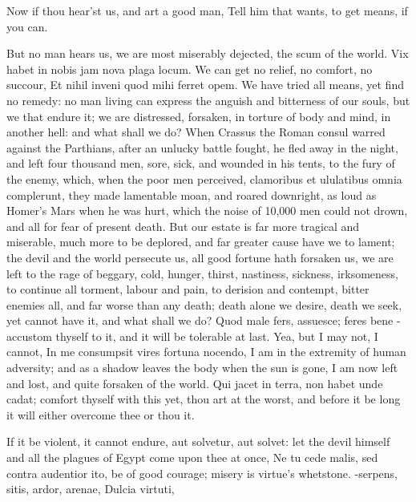 {Now if thou hear'st us, and art a good man,
Tell him that wants, to get means, if you can.

But no man hears us, we are most miserably dejected, the scum of the
world. Vix habet in nobis jam nova plaga locum. We can get no
relief, no comfort, no succour, Et nihil inveni quod mihi ferret
opem. We have tried all means, yet find no remedy: no man living can
express the anguish and bitterness of our souls, but we that endure it;
we are distressed, forsaken, in torture of body and mind, in another
hell: and what shall we do? When Crassus the Roman consul warred
against the Parthians, after an unlucky battle fought, he fled away in
the night, and left four thousand men, sore, sick, and wounded in his
tents, to the fury of the enemy, which, when the poor men perceived,
clamoribus et ululatibus omnia complerunt, they made lamentable moan,
and roared downright, as loud as Homer's Mars when he was hurt, which
the noise of 10,000 men could not drown, and all for fear of present
death. But our estate is far more tragical and miserable, much more to
be deplored, and far greater cause have we to lament; the devil and the
world persecute us, all good fortune hath forsaken us, we are left to
the rage of beggary, cold, hunger, thirst, nastiness, sickness,
irksomeness, to continue all torment, labour and pain, to derision and
contempt, bitter enemies all, and far worse than any death; death alone
we desire, death we seek, yet cannot have it, and what shall we do?
Quod male fers, assuesce; feres bene -accustom thyself to it, and it
will be tolerable at last. Yea, but I may not, I cannot, In me
consumpsit vires fortuna nocendo, I am in the extremity of human
adversity; and as a shadow leaves the body when the sun is gone, I am
now left and lost, and quite forsaken of the world. Qui jacet in terra,
non habet unde cadat; comfort thyself with this yet, thou art at the
worst, and before it be long it will either overcome thee or thou it.

If it be violent, it cannot endure, aut solvetur, aut solvet: let the
devil himself and all the plagues of Egypt come upon thee at once, Ne
tu cede malis, sed contra audentior ito, be of good courage; misery is
virtue's whetstone.
-serpens, sitis, ardor, arenae,
Dulcia virtuti,

}
